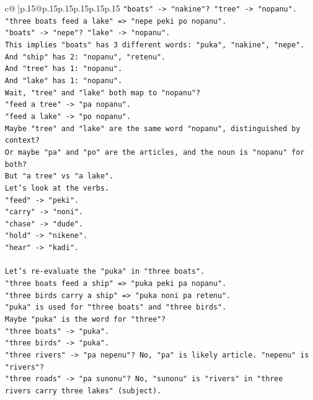 \documentclass{article}
\begin{document}
{\begin{supertabular}{c@{$\;$}|p{.15\linewidth}@{}p{.15\linewidth}p{.15\linewidth}p{.15\linewidth}p{.15\linewidth}p{.15\linewidth}}
{{{\texttt{"boats" {-}> "nakine"? "tree" {-}> "nopanu".} \\
\texttt{"three boats feed a lake" => "nepe peki po nopanu".} \\
\texttt{"boats" {-}> "nepe"? "lake" {-}> "nopanu".} \\
\texttt{This implies "boats" has 3 different words: "puka", "nakine", "nepe".} \\
\texttt{And "ship" has 2: "nopanu", "retenu".} \\
\texttt{And "tree" has 1: "nopanu".} \\
\texttt{And "lake" has 1: "nopanu".} \\
\texttt{Wait, "tree" and "lake" both map to "nopanu"?} \\
\texttt{"feed a tree" {-}> "pa nopanu".} \\
\texttt{"feed a lake" {-}> "po nopanu".} \\
\texttt{Maybe "tree" and "lake" are the same word "nopanu", distinguished by context?} \\
\texttt{Or maybe "pa" and "po" are the articles, and the noun is "nopanu" for both?} \\
\texttt{But "a tree" vs "a lake".} \\
\texttt{Let's look at the verbs.} \\
\texttt{"feed" {-}> "peki".} \\
\texttt{"carry" {-}> "noni".} \\
\texttt{"chase" {-}> "dude".} \\
\texttt{"hold" {-}> "nikene".} \\
\texttt{"hear" {-}> "kadi".} \\
\\ 
\texttt{Let's re{-}evaluate the "puka" in "three boats".} \\
\texttt{"three boats feed a ship" => "puka peki pa nopanu".} \\
\texttt{"three birds carry a ship" => "puka noni pa retenu".} \\
\texttt{"puka" is used for "three boats" and "three birds".} \\
\texttt{Maybe "puka" is the word for "three"?} \\
\texttt{"three boats" {-}> "puka".} \\
\texttt{"three birds" {-}> "puka".} \\
\texttt{"three rivers" {-}> "pa nepenu"? No, "pa" is likely article. "nepenu" is "rivers"?} \\
\texttt{"three roads" {-}> "pa sunonu"? No, "sunonu" is "rivers" in "three rivers carry three lakes" (subject).} \\
}}}
\end{supertabular}}
\end{document}

